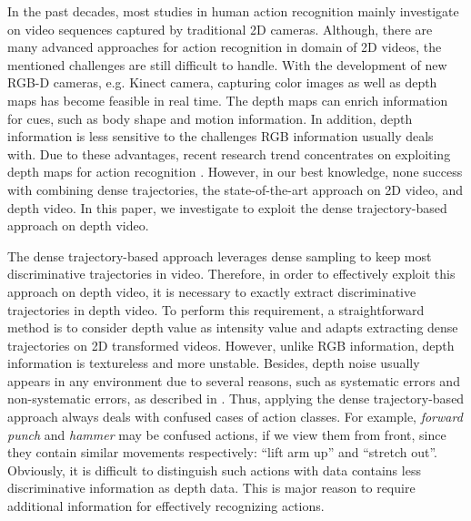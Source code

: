\documentclass[review]{elsarticle}
\begin{document}
In the past decades, most studies in human action recognition mainly investigate on video sequences captured by traditional 2D cameras.
Although, there are many advanced approaches for action recognition in domain of 2D videos, the mentioned challenges are still difficult to handle.
With the development of new RGB-D cameras, e.g. Kinect camera, capturing color images as well as depth maps has become feasible in real time.
The depth maps can enrich information for cues, such as body shape and motion information.
In addition, depth information is less sensitive to the challenges RGB information usually deals with.
Due to these advantages, recent research trend concentrates on exploiting depth maps for action recognition \cite{li2010action, wang2012mining, vieira2012stop, yang2012eigenjoints, yang2012recognizing, wang2012robust, xia2013spatio, oreifej2013hon4d}.
However, in our best knowledge, none success with combining dense trajectories, the state-of-the-art approach on 2D video, and depth video.
In this paper, we investigate to exploit the dense trajectory-based approach on depth video.

The dense trajectory-based approach leverages dense sampling to keep most discriminative trajectories in video.
Therefore, in order to effectively exploit this approach on depth video, it is necessary to exactly extract discriminative trajectories in depth video.
To perform this requirement, a straightforward method is to consider depth value as intensity value and adapts extracting dense trajectories on 2D transformed videos.
However, unlike RGB information, depth information is textureless and more unstable.
Besides, depth noise usually appears in any environment due to several reasons, such as systematic errors and non-systematic errors, as described in \cite{foix2011lock}.
Thus, applying the dense trajectory-based approach always deals with confused cases of action classes.
For example, \textit{forward punch} and \textit{hammer} may be confused actions, if we view them from front, since they contain similar movements respectively: ``lift arm up'' and ``stretch out''.
Obviously, it is difficult to distinguish such actions with data contains less discriminative information as depth data.
This is major reason to require additional information for effectively recognizing actions.
\end{document}
